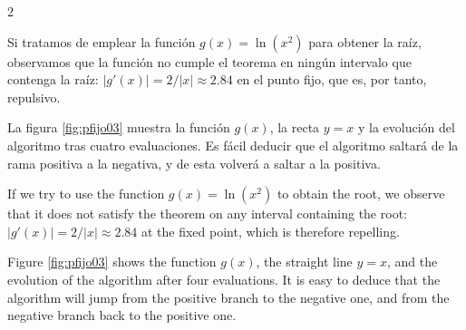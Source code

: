 \begin{paracol}{2}

Si tratamos de emplear la función $g(x)=\ln(x^2)$ para obtener la raíz, observamos que la función no cumple el teorema en ningún intervalo que contenga la raíz: $\vert g'(x)\vert=2/\vert x\vert\approx2.84$ en el punto fijo, que es, por tanto, repulsivo.

La figura \ref{fig:pfijo03} muestra la función $g(x)$, la recta $y=x$ y la evolución del algoritmo tras cuatro evaluaciones. Es fácil deducir que el algoritmo saltará de la rama positiva a la negativa, y de esta volverá a saltar a la positiva.

\switchcolumn

If we try to use the function $g(x)=\ln(x^2)$ to obtain the root, we observe that it does not satisfy the theorem on any interval containing the root: $\vert g'(x)\vert=2/\vert x\vert\approx2.84$ at the fixed point, which is therefore repelling.

Figure \ref{fig:pfijo03} shows the function $g(x)$, the straight line $y=x$, and the evolution of the algorithm after four evaluations. It is easy to deduce that the algorithm will jump from the positive branch to the negative one, and from the negative branch back to the positive one.

\end{paracol}

